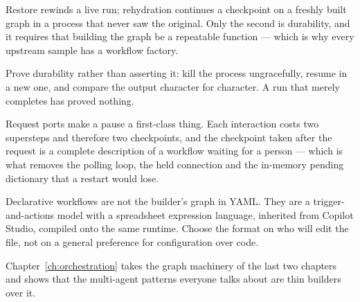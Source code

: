 Restore rewinds a live run; rehydration continues a checkpoint on a freshly built
graph in a process that never saw the original. Only the second is durability,
and it requires that building the graph be a repeatable function --- which is why
every upstream sample has a workflow factory.

Prove durability rather than asserting it: kill the process ungracefully, resume
in a new one, and compare the output character for character. A run that merely
completes has proved nothing.

Request ports make a pause a first-class thing. Each interaction costs two
supersteps and therefore two checkpoints, and the checkpoint taken after the
request is a complete description of a workflow waiting for a person --- which is
what removes the polling loop, the held connection and the in-memory pending
dictionary that a restart would lose.

Declarative workflows are not the builder's graph in YAML. They are a
trigger-and-actions model with a spreadsheet expression language, inherited from
Copilot Studio, compiled onto the same runtime. Choose the format on who will
edit the file, not on a general preference for configuration over code.

Chapter~\ref{ch:orchestration} takes the graph machinery of the last two chapters
and shows that the multi-agent patterns everyone talks about are thin builders
over it.
